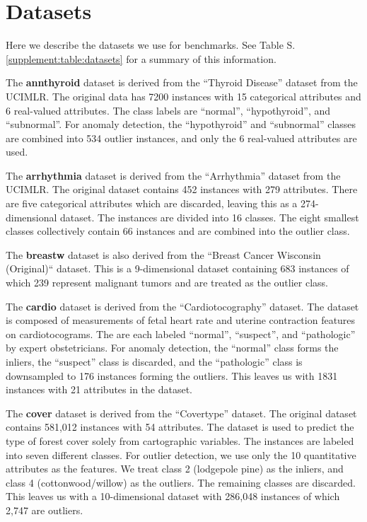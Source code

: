 \documentclass{article}
\begin{document}
\section{Datasets}
\label{supplement:sec:datasets}

Here we describe the datasets we use for benchmarks.
See Table S.\ref{supplement:table:datasets} for a summary of this information.

The \textbf{annthyroid} dataset is derived from the ``Thyroid Disease'' dataset from the UCIMLR\@.
The original data has 7200 instances with 15 categorical attributes and 6 real-valued attributes.
The class labels are ``normal'', ``hypothyroid'', and ``subnormal''.
For anomaly detection, the ``hypothyroid'' and ``subnormal'' classes are combined into 534 outlier instances, and only the 6 real-valued attributes are used.

The \textbf{arrhythmia} dataset is derived from the ``Arrhythmia'' dataset from the UCIMLR\@.
The original dataset contains 452 instances with 279 attributes.
There are five categorical attributes which are discarded, leaving this as a 274-dimensional dataset.
The instances are divided into 16 classes.
The eight smallest classes collectively contain 66 instances and are combined into the outlier class.

The \textbf{breastw} dataset is also derived from the ``Breast Cancer Wisconsin (Original)`` dataset.
This is a 9-dimensional dataset containing 683 instances of which 239 represent malignant tumors and are treated as the outlier class.

The \textbf{cardio} dataset is derived from the ``Cardiotocography'' dataset.
The dataset is composed of measurements of fetal heart rate and uterine contraction features on cardiotocograms.
The are each labeled ``normal'', ``suspect'', and ``pathologic'' by expert obstetricians.
For anomaly detection, the ``normal'' class forms the inliers, the ``suspect'' class is discarded, and the ``pathologic'' class is downsampled to 176 instances forming the outliers.
This leaves us with 1831 instances with 21 attributes in the dataset.

The \textbf{cover} dataset is derived from the ``Covertype'' dataset.
The original dataset contains 581,012 instances with 54 attributes.
The dataset is used to predict the type of forest cover solely from cartographic variables.
The instances are labeled into seven different classes.
For outlier detection, we use only the 10 quantitative attributes as the features.
We treat class 2 (lodgepole pine) as the inliers, and class 4 (cottonwood/willow) as the outliers.
The remaining classes are discarded.
This leaves us with a 10-dimensional dataset with 286,048 instances of which 2,747 are outliers.
\end{document}
